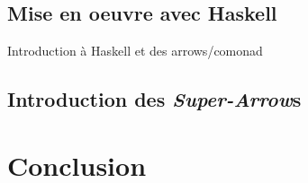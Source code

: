 \documentclass{llncs}
\newcommand{\SAs}{\emph{Super-Arrow}s }
\begin{document}
\subsection{Mise en oeuvre avec Haskell}
Introduction à Haskell et des arrows/comonad
\subsection{Introduction des \SAs}

\section{Conclusion}





\end{document}
